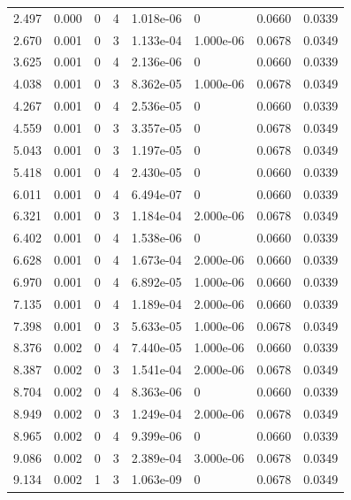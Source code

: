 \documentclass[preview]{standalone}
\begin{document}
{{\begin{tabular}{L{1.2cm}C{1.2cm} C{0.3cm}C{0.5cm} C{1.4cm}C{1.4cm} C{1.4cm}C{1.4cm}}
  2.497  &  0.000  & 0     &  4 &  1.018e-06  & 0  & 0.0660 &  0.0339   \\ 
  2.670  &  0.001  & 0     &  3 &  1.133e-04  & 1.000e-06  & 0.0678 &  0.0349   \\ 
  3.625  &  0.001  & 0     &  4 &  2.136e-06  & 0  & 0.0660 &  0.0339   \\ 
  4.038  &  0.001  & 0     &  3 &  8.362e-05  & 1.000e-06  & 0.0678 &  0.0349   \\ 
  4.267  &  0.001  & 0     &  4 &  2.536e-05  & 0  & 0.0660 &  0.0339   \\ 
  4.559  &  0.001  & 0     &  3 &  3.357e-05  & 0  & 0.0678 &  0.0349   \\ 
  5.043  &  0.001  & 0     &  3 &  1.197e-05  & 0  & 0.0678 &  0.0349   \\ 
  5.418  &  0.001  & 0     &  4 &  2.430e-05  & 0  & 0.0660 &  0.0339   \\ 
  6.011  &  0.001  & 0     &  4 &  6.494e-07  & 0  & 0.0660 &  0.0339   \\ 
  6.321  &  0.001  & 0     &  3 &  1.184e-04  & 2.000e-06  & 0.0678 &  0.0349   \\ 
  6.402  &  0.001  & 0     &  4 &  1.538e-06  & 0  & 0.0660 &  0.0339   \\ 
  6.628  &  0.001  & 0     &  4 &  1.673e-04  & 2.000e-06  & 0.0660 &  0.0339   \\ 
  6.970  &  0.001  & 0     &  4 &  6.892e-05  & 1.000e-06  & 0.0660 &  0.0339   \\ 
  7.135  &  0.001  & 0     &  4 &  1.189e-04  & 2.000e-06  & 0.0660 &  0.0339   \\ 
  7.398  &  0.001  & 0     &  3 &  5.633e-05  & 1.000e-06  & 0.0678 &  0.0349   \\ 
  8.376  &  0.002  & 0     &  4 &  7.440e-05  & 1.000e-06  & 0.0660 &  0.0339   \\ 
  8.387  &  0.002  & 0     &  3 &  1.541e-04  & 2.000e-06  & 0.0678 &  0.0349   \\ 
  8.704  &  0.002  & 0     &  4 &  8.363e-06  & 0  & 0.0660 &  0.0339   \\ 
  8.949  &  0.002  & 0     &  3 &  1.249e-04  & 2.000e-06  & 0.0678 &  0.0349   \\ 
  8.965  &  0.002  & 0     &  4 &  9.399e-06  & 0  & 0.0660 &  0.0339   \\ 
  9.086  &  0.002  & 0     &  3 &  2.389e-04  & 3.000e-06  & 0.0678 &  0.0349   \\ 
  9.134  &  0.002  & 1     &  3 &  1.063e-09  & 0  & 0.0678 &  0.0349   \\ 

\end{tabular}}}
\end{document}
